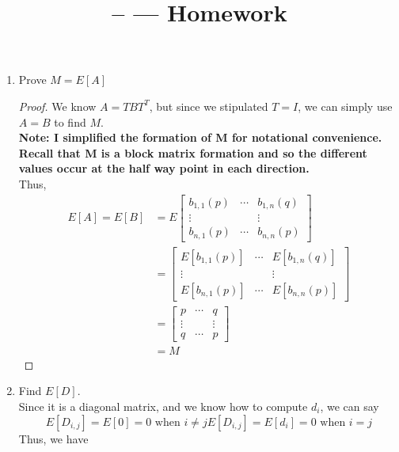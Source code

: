 \documentclass[11pt]{article}
\title{\CRS -- \Session --- Homework \Homework} %
\author{\Name}
\date{}
\begin{document}
\maketitle

\begin{enumerate}
	\item Prove $M = E[A]$ \\
	\begin{proof}
	We know $A = TBT^{T}$, but since we stipulated $T = I$, we can simply use $A = B$ to find $M$. \\
	\textbf{Note: I simplified the formation of M for notational convenience. Recall that M is a block matrix formation and so the different values occur at the half way point in each direction.} \\
	Thus,
	\begin{align*}
	E[A] = E[B] &= E \begin{bmatrix}
	b_{1,1}(p) & \cdots & b_{1,n}(q) \\
	\vdots &  & \vdots \\
	b_{n,1}(p) & \cdots & b_{n,n}(p)
	\end{bmatrix} \\
	&= \begin{bmatrix}
	E[b_{1,1}(p)] & \cdots & E[b_{1,n}(q)] \\
	\vdots & & \vdots \\
	E[b_{n,1}(p)] & \cdots & E[b_{n,n}(p)]
	\end{bmatrix} \\
	&= \begin{bmatrix}
	p & \cdots & q \\
	\vdots & & \vdots \\
	q & \cdots & p
	\end{bmatrix} \\
	&= M
	\end{align*}
	\end{proof}
	\item Find $E[D]$. \\
	Since it is a diagonal matrix, and we know how to compute $d_{i}$, we can say
	\begin{subequations}
		\begin{equation}
		E[D_{i,j}] = E[0] = 0 \text{ when $i \neq j$}
		\end{equation}
		\begin{equation}
		E[D_{i,j}] = E[d_i] = 0 \text{ when $i = j$}
		\end{equation}
	\end{subequations}
	Thus, we have

\end{enumerate}
\end{document}
